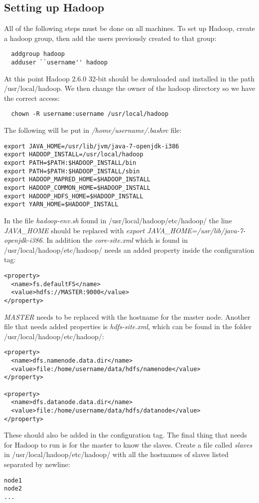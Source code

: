\subsection{Setting up Hadoop}
All of the following steps must be done on all machines. To set up Hadoop, create a hadoop group, then add the users previously created to that group:
\begin{lstlisting}
  addgroup hadoop
  adduser ``username'' hadoop
\end{lstlisting}
At this point Hadoop 2.6.0 32-bit should be downloaded and installed in the path \textsf{/usr/local/hadoop}. We then change the owner of the hadoop directory so we have the correct access:
\begin{lstlisting}
  chown -R username:username /usr/local/hadoop
\end{lstlisting}
The following will be put in \emph{/home/username/.bashrc} file:
\begin{verbatim}
export JAVA_HOME=/usr/lib/jvm/java-7-openjdk-i386
export HADOOP_INSTALL=/usr/local/hadoop
export PATH=$PATH:$HADOOP_INSTALL/bin
export PATH=$PATH:$HADOOP_INSTALL/sbin
export HADOOP_MAPRED_HOME=$HADOOP_INSTALL
export HADOOP_COMMON_HOME=$HADOOP_INSTALL
export HADOOP_HDFS_HOME=$HADOOP_INSTALL
export YARN_HOME=$HADOOP_INSTALL
\end{verbatim}
In the file \emph{hadoop-env.sh} found in \textsf{/usr/local/hadoop/etc/hadoop/} the line \emph{JAVA\_HOME} should be replaced with \emph{export JAVA\_HOME=/usr/lib/java-7-openjdk-i386}.
In addition the \emph{core-site.xml} which is found in \textsf{/usr/local/hadoop/etc/hadoop/} needs an added property inside the configuration tag: 
\begin{verbatim}
<property>
  <name>fs.defaultFS</name>
  <value>hdfs://MASTER:9000</value>
</property>
\end{verbatim}
\emph{MASTER} needs to be replaced with the hostname for the master node. Another file that needs added properties is \emph{hdfs-site.xml}, which can be found in the folder \textsf{/usr/local/hadoop/etc/hadoop/}:
\begin{verbatim}
<property>
  <name>dfs.namenode.data.dir</name>
  <value>file:/home/username/data/hdfs/namenode</value>
</property>

<property>
  <name>dfs.datanode.data.dir</name>
  <value>file:/home/username/data/hdfs/datanode</value>
</property>
\end{verbatim}
These should also be added in the configuration tag.
The final thing that needs for Hadoop to run is for the master to know the slaves. Create a file called \emph{slaves} in \textsf{/usr/local/hadoop/etc/hadoop/} with all the hostnames of slaves listed separated by newline:
\begin{verbatim}
node1
node2
...
\end{verbatim}


